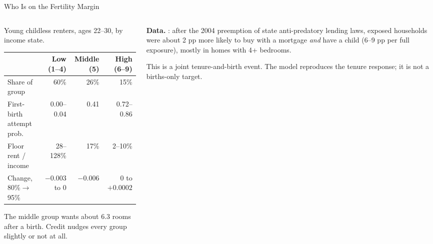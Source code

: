 \begin{frame}[t]{Who Is on the Fertility Margin}
\footnotesize
\begin{columns}[T,onlytextwidth]
\begin{column}{0.60\textwidth}
Young childless renters, ages 22--30, by income state.
\smallskip

\scriptsize\setlength{\tabcolsep}{3pt}
\renewcommand{\arraystretch}{1.12}
\begin{tabular}{@{}lrrr@{}}
\toprule
 & Low (1--4) & Middle (5) & High (6--9) \\
\midrule
Share of group & 60\% & 26\% & 15\% \\
First-birth attempt prob. & 0.00--0.04 & 0.41 & 0.72--0.86 \\
Floor rent / income & 28--128\% & 17\% & 2--10\% \\
Change, 80\%$\to$95\% & $-0.003$ to 0 & $-0.006$ & 0 to $+0.0002$ \\
\bottomrule
\end{tabular}
\smallskip

\scriptsize The middle group wants about 6.3 rooms after a birth. Credit nudges every group slightly or not at all.
\end{column}
\begin{column}{0.36\textwidth}
\textbf{Data.} : after the 2004 preemption of state anti-predatory lending laws, exposed
households were about 2 pp more likely to buy with a mortgage \emph{and} have a child (6--9 pp per full exposure), mostly in homes with 4+ bedrooms.
\medskip

This is a joint tenure-and-birth event. The model reproduces the tenure response; it is not a births-only target.
\end{column}
\end{columns}
\vfill
{}
\end{frame}


